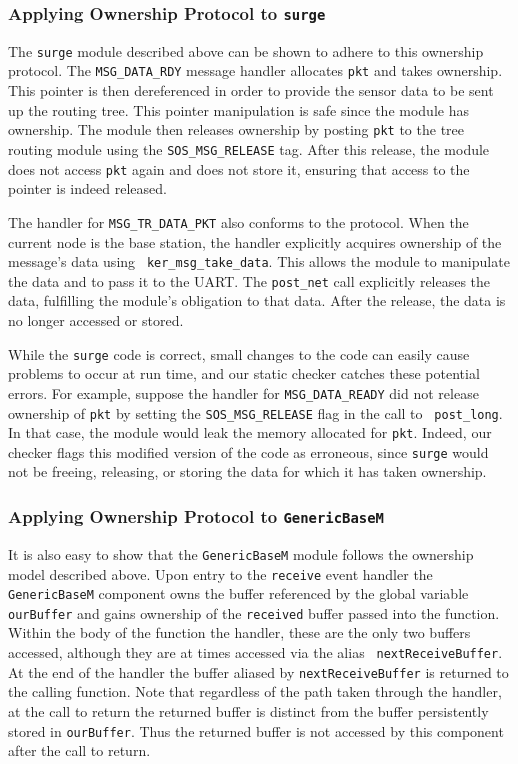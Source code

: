\subsubsection{Applying Ownership Protocol to {\tt surge}}

The {\tt surge} module described above can be shown to adhere to this
ownership protocol.  The {\tt MSG\_DATA\_RDY} message handler
allocates {\tt pkt} and takes ownership. This pointer is then
dereferenced in order to provide the sensor data to be sent up the
routing tree.  This pointer manipulation is safe since the module has
ownership.  The module then releases ownership by posting {\tt pkt} to
the tree routing module using the {\tt SOS\_MSG\_RELEASE} tag.  After
this release, the module does not access {\tt pkt} again and does not
store it, ensuring that access to the pointer is indeed released. 

The handler for {\tt MSG\_TR\_DATA\_PKT} also conforms to the
protocol.   When the current node is the base station, the handler
explicitly acquires ownership of the message's data using {\tt
ker\_msg\_take\_data}.  This allows the module to manipulate the data
and to pass it to the UART.  The {\tt post\_net} call explicitly
releases the data, fulfilling the module's obligation to that data.
After the release, the data is no longer accessed or stored.

While the {\tt surge} code is correct, small changes to the code can
easily cause problems to occur at run time, and our static checker
catches these potential errors.  For example, suppose the handler for
{\tt MSG\_DATA\_READY} did not release ownership of {\tt pkt} by
setting the {\tt SOS\_MSG\_RELEASE} flag in the call to {\tt
post\_long}.  In that case, the module would leak the memory allocated
for {\tt pkt}.  Indeed, our checker flags this modified version of the
code as erroneous, since {\tt surge} would not be freeing, releasing,
or storing the data for which it has taken ownership.


\subsubsection{Applying Ownership Protocol to {\tt GenericBaseM}}

It is also easy to show that the {\tt GenericBaseM} module follows the
ownership model described above.  Upon entry to the {\tt receive}
event handler the {\tt GenericBaseM} component owns the buffer
referenced by the global variable {\tt ourBuffer} and gains ownership
of the {\tt received} buffer passed into the function.  Within the
body of the function the handler, these are the only two buffers
accessed, although they are at times accessed via the alias {\tt
nextReceiveBuffer}.  At the end of the handler the buffer aliased by
{\tt nextReceiveBuffer} is returned to the calling function.  Note
that regardless of the path taken through the handler, at the call to
return the returned buffer is distinct from the buffer persistently
stored in {\tt ourBuffer}.  Thus the returned buffer is not accessed
by this component after the call to return.


